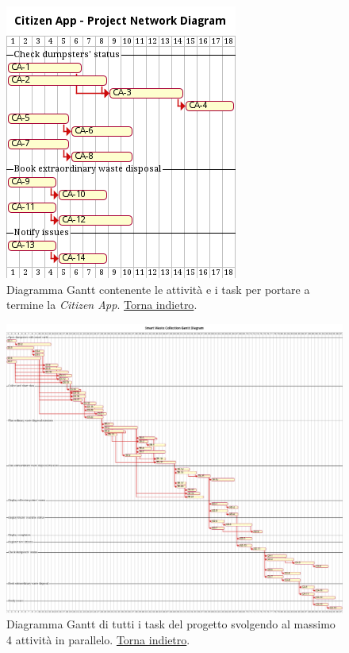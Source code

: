 \begin{figure}[H]
    \centering
    \includegraphics[width=\textwidth]{img/gantt-citizen-app.pm}
    \caption{Diagramma Gantt contenente le attività e i task per portare a termine la \textit{Citizen App}. \hyperlink{back:gantt-citizen-app}{Torna indietro}.}
    \label{fig:gantt-citizen-app}
\end{figure}

\begin{figure}[H]
    \centering
    \includegraphics[width=\textwidth]{img/gantt.pm}
    \caption{Diagramma Gantt di tutti i task del progetto svolgendo al massimo 4 attività in parallelo.  \hyperlink{back:gantt}{Torna indietro}.}
    \label{fig:gantt}
\end{figure}
